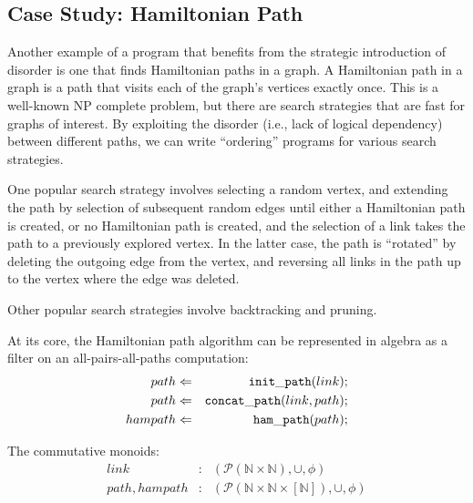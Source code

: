 
\subsection{Case Study: Hamiltonian Path}

Another example of a program that benefits from the strategic introduction of disorder is one that finds Hamiltonian paths in a graph.  A Hamiltonian path in a graph is a path that visits each of the graph's vertices exactly once.  This is a well-known NP complete problem, but there are search strategies that are fast for graphs of interest.  By exploiting the disorder (i.e., lack of logical dependency) between different paths, we can write ``ordering'' programs for various search strategies.

One popular search strategy involves selecting a random vertex, and extending the path by selection of subsequent random edges until either a Hamiltonian path is created, or no Hamiltonian path is created, and the selection of a link takes the path to a previously explored vertex.  In the latter case, the path is ``rotated'' by deleting the outgoing edge from the vertex, and reversing all links in the path up to the vertex where the edge was deleted.

Other popular search strategies involve backtracking and pruning.


At its core, the Hamiltonian path algorithm can be represented in algebra as a filter on an all-pairs-all-paths computation:
\begin{eqnarray*}
path &\Leftarrow& {\tt init\_path}(link); \\
path &\Leftarrow& {\tt concat\_path}(link, path); \\
hampath &\Leftarrow& {\tt ham\_path}(path);
\end{eqnarray*}

The commutative monoids:
\begin{eqnarray*}
link &:& \left(\mathcal{P}(\mathbb{N} \times \mathbb{N}), \cup, \phi\right) \\
path, hampath &:& \left(\mathcal{P}(\mathbb{N} \times \mathbb{N} \times [\mathbb{N}]), \cup, \phi\right) \\
\end{eqnarray*}

